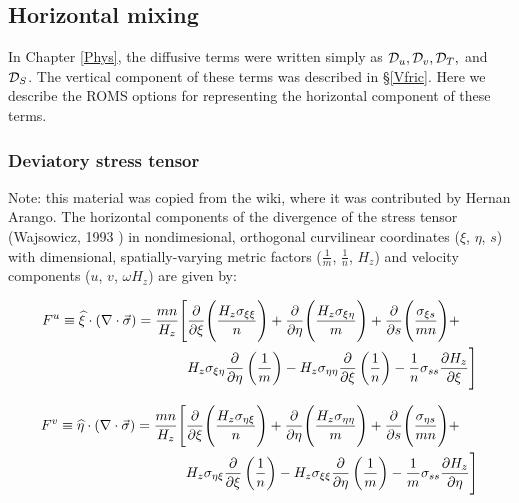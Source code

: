 \subsection{Horizontal mixing}

In Chapter \ref{Phys}, the diffusive terms were written simply as
${\cal D}_u, {\cal D}_v, {\cal D}_T,$ and ${\cal D}_S$.  The vertical
component of these terms was described in \S\ref{Vfric}.  Here we
describe the ROMS options for representing the horizontal
component of these terms.

\subsubsection{Deviatory stress tensor}
\label{Smooth}

Note: this material was copied from the wiki, where it was
contributed by Hernan Arango.
The horizontal components of the divergence of the stress tensor
(Wajsowicz, 1993 \cite{Wajsowicz_93}) in
nondimesional, orthogonal curvilinear coordinates ($\xi$, $\eta$,
$s$) with dimensional, spatially-varying metric factors
($\frac{1}{m}$, $\frac{1}{n}$, $H_{z}$) and velocity components
($u$, $v$, $\omega H_{z}$) are given by:

\begin{align}
      F^{u} \equiv
\widehat{\xi}\cdot\left(\nabla\cdot\vec{\sigma}\right) =
          \frac{mn}{H_{z}} \Biggl[ & {\frac{\partial }{\partial \xi}}  \Biggl(
\frac{H_{z}{\sigma}_{\xi\xi}} {n} \Biggr) +
                                     {\frac{\partial }{\partial \eta}} \Biggl(
\frac{H_{z}{\sigma}_{\xi\eta}}{m} \Biggr) +
                                     {\frac{\partial }{\partial s}}    \Biggl(
\frac{{\sigma}_{\xi s}}{mn} \Biggr) + \\
         &H_{z}{\sigma}_{\xi\eta}  {\frac{\partial }{\partial \eta}} \left(
\frac{1}{m}\right) -
          H_{z}{\sigma}_{\eta\eta} {\frac{\partial }{\partial \xi}}  \left(
\frac{1}{n}\right) -
          \frac{1}{n} {\sigma}_{ss}{\frac{\partial H_{z}}{\partial \xi}} \Biggr]
\label{eqstressu}
\end{align}

\begin{align}
      F^{v} \equiv
\widehat{\eta}\cdot\left(\nabla\cdot\vec{\sigma}\right) =
          \frac{mn}{H_{z}} \Biggl[ & {\frac{\partial }{\partial \xi}}  \Biggl(
\frac{H_{z}{\sigma}_{\eta\xi}} {n} \Biggr) +
                                     {\frac{\partial }{\partial \eta}} \Biggl(
\frac{H_{z}{\sigma}_{\eta\eta}}{m} \Biggr) +
                                     {\frac{\partial }{\partial s}}    \Biggl(
\frac{{\sigma}_{\eta s}}{mn} \Biggr) + \\
         &H_{z}{\sigma}_{\eta\xi}  {\frac{\partial }{\partial \xi}}  \left(
\frac{1}{n} \right) -
          H_{z}{\sigma}_{\xi\xi}   {\frac{\partial }{\partial \eta}} \left(
\frac{1}{m} \right) -
          \frac{1}{m}{\sigma}_{ss} {\frac{\partial H_{z}}{\partial \eta}} \Biggr]
\label{eqstressv}
\end{align}

